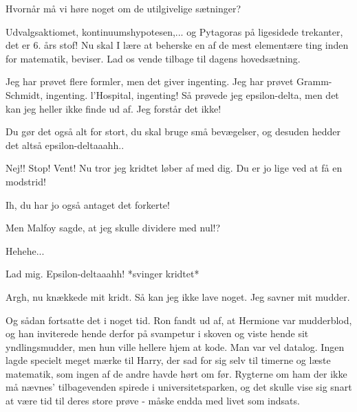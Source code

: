 \documentclass[a4paper,11pt]{article}
\begin{document}
\begin{sketch}

 Hvornår må vi høre noget om de utilgivelige sætninger?

 Udvalgsaktiomet, kontinuumshypotesen,... og Pytagoras på ligesidede trekanter, det er 6. års stof! Nu skal I lære at beherske en af de mest elementære ting inden for matematik, beviser. Lad os vende tilbage til dagens hovedsætning.


 Jeg har prøvet flere formler, men det giver ingenting. Jeg har prøvet Gramm-Schmidt, ingenting. l'Hospital, ingenting! Så prøvede jeg epsilon-delta, men det kan jeg heller ikke finde ud af. Jeg forstår det ikke!

 Du gør det også alt for stort, du skal bruge små bevægelser, og desuden hedder det altså epsilon-deltaaahh..


 Nej!! Stop! Vent! Nu tror jeg kridtet løber af med dig. Du er jo lige ved at få en modstrid!


 Ih, du har jo også antaget det forkerte!

 Men Malfoy sagde, at jeg skulle dividere med nul!?

 Hehehe...

 Lad mig. Epsilon-deltaaahh! *svinger kridtet*


 Argh, nu knækkede mit kridt. Så kan jeg ikke lave noget. Jeg savner mit mudder.


 Og sådan fortsatte det i noget tid. Ron fandt ud af, at Hermione var mudderblod, og han inviterede hende derfor på svampetur i skoven og viste hende sit yndlingsmudder, men hun ville hellere hjem at kode. Man var vel datalog. Ingen lagde specielt meget mærke til Harry, der sad for sig selv til timerne og læste matematik, som ingen af de andre havde hørt om før. Rygterne om ham der ikke må nævnes' tilbagevenden spirede i universitetsparken, og det skulle vise sig snart at være tid til deres store prøve - måske endda med livet som indsats.


\end{sketch}
\end{document}
